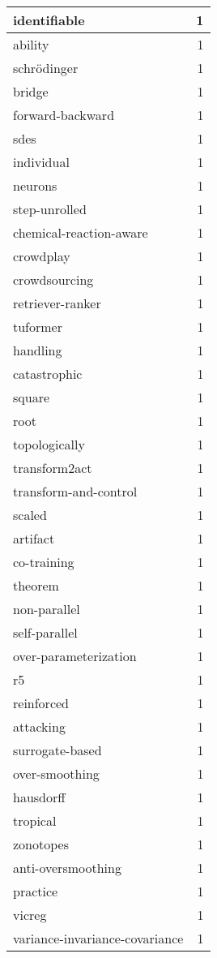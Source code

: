 \begin{table}[h]
\begin{tabular}{|l|r|}
\hline
identifiable & 1 \\
\hline
ability & 1 \\
\hline
schrödinger & 1 \\
\hline
bridge & 1 \\
\hline
forward-backward & 1 \\
\hline
sdes & 1 \\
\hline
individual & 1 \\
\hline
neurons & 1 \\
\hline
step-unrolled & 1 \\
\hline
chemical-reaction-aware & 1 \\
\hline
crowdplay & 1 \\
\hline
crowdsourcing & 1 \\
\hline
retriever-ranker & 1 \\
\hline
tuformer & 1 \\
\hline
handling & 1 \\
\hline
catastrophic & 1 \\
\hline
square & 1 \\
\hline
root & 1 \\
\hline
topologically & 1 \\
\hline
transform2act & 1 \\
\hline
transform-and-control & 1 \\
\hline
scaled & 1 \\
\hline
artifact & 1 \\
\hline
co-training & 1 \\
\hline
theorem & 1 \\
\hline
non-parallel & 1 \\
\hline
self-parallel & 1 \\
\hline
over-parameterization & 1 \\
\hline
r5 & 1 \\
\hline
reinforced & 1 \\
\hline
attacking & 1 \\
\hline
surrogate-based & 1 \\
\hline
over-smoothing & 1 \\
\hline
hausdorff & 1 \\
\hline
tropical & 1 \\
\hline
zonotopes & 1 \\
\hline
anti-oversmoothing & 1 \\
\hline
practice & 1 \\
\hline
vicreg & 1 \\
\hline
variance-invariance-covariance & 1 \\

\end{tabular}
\end{table}
